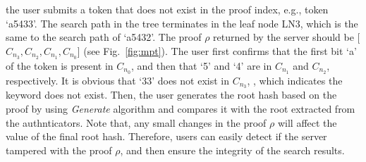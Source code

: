  the user submits a token that does not exist in the proof index, e.g., token `a5433'. The search path in the tree terminates in the leaf node LN3, which is the same to the search path of `a5432'. The proof $\rho$ returned by the server should be [$C_{n_3}, C_{n_2}, C_{n_1}, C_{n_0}$] (see Fig.~\ref{fig:mpt}). %
The user first confirms that the first bit `a' of the token is present in $C_{n_0}$, and then  that `5' and `4' are in $C_{n_1}$ and $C_{n_2}$, respectively. It is obvious that `33' does not exist in $C_{n_3}$, , which indicates the keyword does not exist. %
Then, the user generates the root hash based on the proof by using {\it Generate} algorithm and compares it with the root extracted from the authnticators. Note that, any small changes in the proof $\rho$ will affect the value of the final root hash. Therefore, users can easily detect if the server tampered with the proof $\rho$, and then ensure the integrity of the search results.


